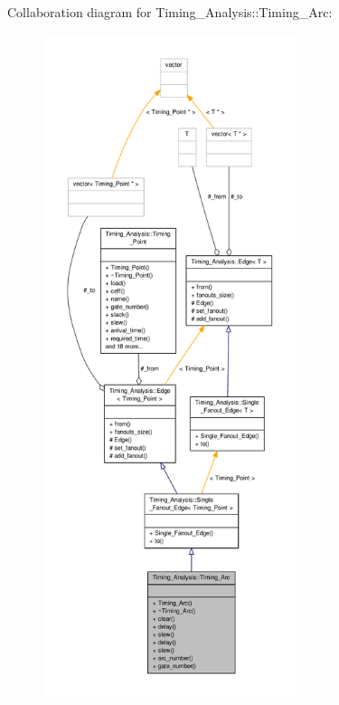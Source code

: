 Collaboration diagram for Timing\-\_\-\-Analysis\-:\-:Timing\-\_\-\-Arc\-:\nopagebreak
\begin{figure}[H]
\begin{center}
\leavevmode
\includegraphics[height=550pt]{classTiming__Analysis_1_1Timing__Arc__coll__graph}
\end{center}
\end{figure}
